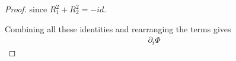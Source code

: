 \documentclass[11pt]{amsart}
\numberwithin{equation}{section}
\begin{document}
\begin{proof}
		since $R_1^2+R_2^2=-id$.

	Combining all these identities and rearranging the terms gives
		\begin{align}
			\partial_t \Phi %

\end{align}
\end{proof}
\end{document}
